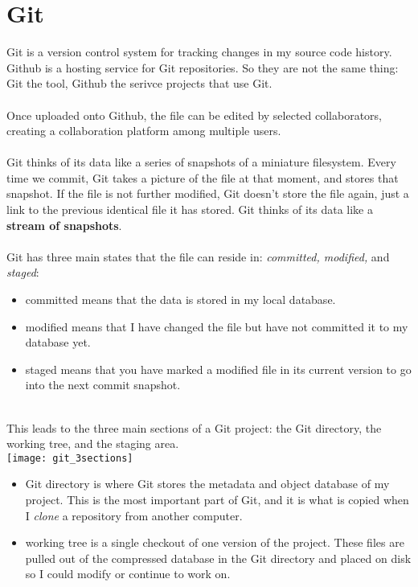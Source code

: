 \documentclass{article}
\begin{document}
{{\section{Git}
Git is a version control system for tracking changes in my source code history. Github is a hosting service for Git repositories. So they are not the same thing: Git the tool, Github the serivce projects that use Git. \\
\\
Once uploaded onto Github, the file can be edited by selected collaborators, creating a collaboration platform among multiple users. \\
\\
Git thinks of its data like a series of snapshots of a miniature filesystem. Every time we commit, Git takes a picture of the file at that moment, and stores that snapshot. If the file is not further modified, Git doesn't store the file again, just a link to the previous identical file it has stored. Git thinks of its data like a \textbf{stream of snapshots}.\\
\\
Git has three main states that the file can reside in: \textit{committed, modified,} and \textit{staged}:
\begin{itemize}
  \item committed means that the data is stored in my local database.
  \item modified means that I have changed the file but have not committed it to my database yet.
  \item staged means that you have marked a modified file in its current version to go into the next commit snapshot. 
\end{itemize}
\\
This leads to the three main sections of a Git project: the Git directory, the working tree, and the staging area.\\
\texttt{[image: git\_3sections]}\\
\begin{itemize}
  \item Git directory is where Git stores the metadata and object database of my project. This is the most important part of Git, and it is what is copied when I \textit{clone} a repository from another computer.
  \item working tree is a single checkout of one version of the project. These files are pulled out of the compressed database in the Git directory and placed on disk so I could modify or continue to work on. 

\end{itemize}}}
\end{document}
